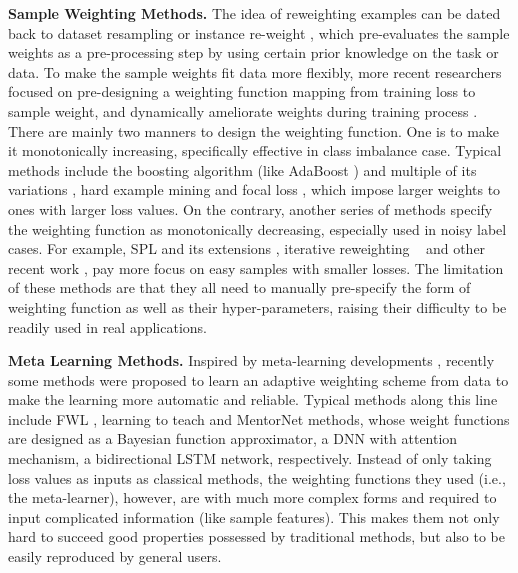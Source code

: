 \documentclass{article}
\begin{document}
	\textbf{Sample Weighting Methods.}
	The idea of reweighting examples can be dated back to dataset resampling \cite{chawla2002smote,dong2017class} or instance re-weight \cite{zadrozny2004learning}, which pre-evaluates the sample weights as a pre-processing step by using certain prior knowledge on the task or data. To make the sample weights fit data more flexibly, more recent researchers focused on pre-designing a weighting function mapping from training loss to sample weight, and dynamically ameliorate weights during training process \cite{elkan2001foundations,khan2018cost}. There are mainly two manners to design the weighting function. One is to make it monotonically increasing, specifically effective in class imbalance case. Typical methods include the boosting algorithm (like AdaBoost \cite{freund1997decision}) and multiple of its variations \cite{johnson2019survey},
hard example mining \cite{malisiewicz2011ensemble} and focal loss \cite{lin2018focal}, which impose larger weights to ones with larger loss values.
On the contrary, another series of methods specify the weighting function as monotonically decreasing, especially used in noisy label cases. For example, SPL \cite{kumar2010self} and its extensions \cite{jiang2014easy,jiang2014self}, iterative reweighting ~\cite{fernando2003reweight,zhang2018generalized} and other recent work \cite{chang2017active,wang2017robust}, pay more focus on easy samples with smaller losses.
The limitation of these methods are that they all need to manually pre-specify the form of weighting function as well as their hyper-parameters, raising their difficulty to be readily used in real applications.
	
	\textbf{Meta Learning Methods.} Inspired by meta-learning developments \cite{lake2015human,shu2018small,ravi2016optimization,finn2017model,snell2017prototypical}, recently some methods were proposed to learn an adaptive weighting scheme from data to make the learning more automatic and reliable.
	Typical methods along this line include FWL \cite{dehghani2017fidelity}, learning to teach \cite{fan2018learning,wu2018learning} and MentorNet \cite{jiang2018mentornet} methods, whose weight functions are designed as a Bayesian function approximator, a DNN with attention mechanism, a bidirectional LSTM network, respectively. Instead of only taking loss values as inputs as classical methods, the weighting functions they used (i.e., the meta-learner), however, are with much more complex forms and required to input complicated information (like sample features). This makes them not only hard to succeed good properties possessed by traditional methods, but also to be easily reproduced by general users. \vspace{0mm}
	
\end{document}
